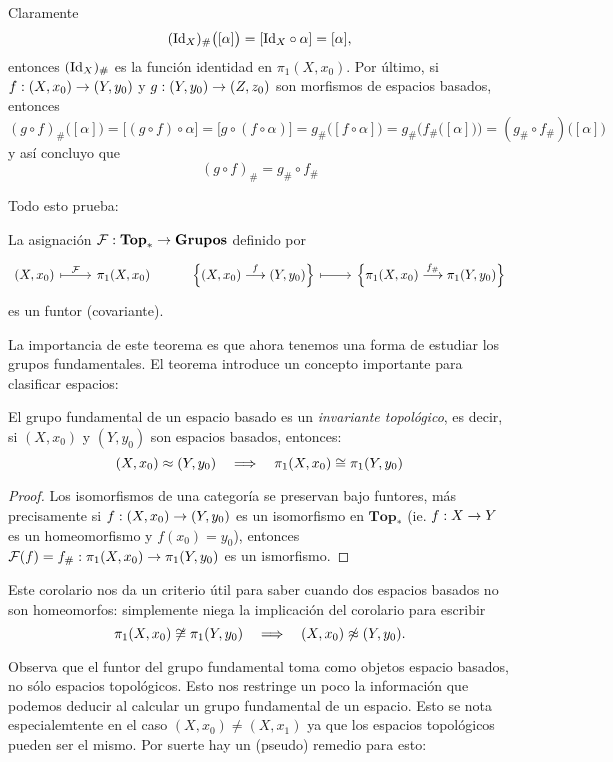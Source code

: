 \documentclass[../../topologia_algebraica]{subfiles}
\begin{document}
Claramente
\[
  (\text{Id}_X)_{\#}\big( [\alpha] \big)=[\text{Id}_X\circ\alpha]=[\alpha],
\]
entonces $(\text{Id}_X)_{\#}$ es la funci\'on identidad en $\pi_1(X,x_0)$. Por \'ultimo, si
$f:(X,x_0)\rightarrow (Y,y_0)$ y $g:(Y,y_0)\rightarrow(Z,z_0)$ son morfismos de espacios basados, entonces 
\[
  (g\circ f)_{\#}\big( [\alpha] \big)= \big[ (g\circ f) \circ\alpha \big]=
  \big[ g\circ (f \circ\alpha) \big]=g_{\#}\Big( [f\circ\alpha] \Big)=
  g_{\#}\Big( f_{\#}\big([\alpha]\big) \Big)=(g_{\#}\circ f_{\#})\big( [\alpha] \big)
\]
y as\'i concluyo que
\[
  (g\circ f)_{\#}=g_{\#}\circ f_{\#}
\]

Todo esto prueba:
\begin{thm}\label{thm:grupo_fundamental_funtor}
  La asignaci\'on $\mathcal{F}:\mathbf{Top}_*\rightarrow \mathbf{Grupos}$ definido por
  \[
    \begin{tikzcd}
      (X,x_0) \arrow[r,mapsto,"\Ff"] & \pi_1(X,x_0) &
      \Big\{ (X,x_0)\morf{f}(Y,y_0) \Big\} \arrow[r,mapsto] &
      \Big\{ \pi_1(X,x_0)\morf{f_{\#}}\pi_1(Y,y_0) \Big\}
    \end{tikzcd}
  \]
  es un funtor (covariante).
\end{thm}

La importancia de este teorema es que ahora tenemos una forma de estudiar los grupos fundamentales.
El teorema introduce un concepto importante para clasificar espacios:

\begin{cor}
  El grupo fundamental de un espacio basado es un \emph{invariante topol\'ogico}, es decir, si
  $(X,x_0)$ y $(Y,y_0)$ son espacios basados, entonces:
  \[
    (X,x_0)\approx(Y,y_0) \quad\Longrightarrow\quad \pi_1(X,x_0)\cong \pi_1(Y,y_0) 
  \]
\end{cor}
\begin{proof}
  Los isomorfismos de una categor\'ia se preservan bajo funtores, m\'as precisamente si
  $f:(X,x_0)\rightarrow(Y,y_0)$ es un isomorfismo en $\mathbf{Top}_*$ (ie. $f:X\rightarrow Y$ es un homeomorfismo
  y $f(x_0)=y_0$), entonces $\mathcal{F}(f)=f_{\#}:\pi_1(X,x_0)\rightarrow\pi_1(Y,y_0)$ es un ismorfismo.
\end{proof}

\begin{nota}
  Este corolario nos da un criterio \'util para saber cuando dos espacios basados no son homeomorfos:
  simplemente niega la implicaci\'on del corolario para escribir
  \[
    \pi_1(X,x_0)\not\cong \pi_1(Y,y_0) \quad\Longrightarrow\quad (X,x_0)\not\approx(Y,y_0).
  \]
\end{nota}

Observa que el funtor del grupo fundamental toma como objetos espacio basados, no s\'olo espacios
topol\'ogicos. Esto nos restringe un poco la informaci\'on que podemos deducir al calcular un
grupo fundamental de un espacio. Esto se nota especialemtente en el caso $(X,x_0)\neq(X,x_1)$ ya que
los espacios topol\'ogicos pueden ser el mismo. Por suerte hay un (pseudo) remedio para esto:
\end{document}
